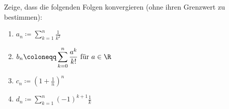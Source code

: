 \begin{prob}Zeige, dass die folgenden Folgen konvergieren (ohne ihren Grenzwert
  zu bestimmen):
  \begin{enumerate}[label=(\alph*)]
  \item $\displaystyle a_n \coloneqq \sum_{k=1}^n\frac{1}{k^2}$
  \item $\displaystyle b_n \coloneqq \sum_{k=0}^n\frac{a^k}{k!}\ \text{für } a \in \R$
  \item $\displaystyle c_n \coloneqq \left( 1+\frac{1}{n} \right)^n$
  \item $\displaystyle d_n \coloneqq \sum_{k=1}^n (-1)^{k+1}\frac{1}{k}$
  \end{enumerate}
\end{prob}
